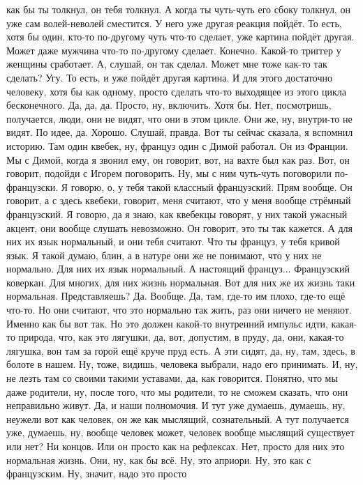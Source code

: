 как бы ты толкнул,
он тебя толкнул. А когда ты чуть-чуть
его сбоку толкнул, он уже сам
волей-неволей сместится.
У него уже другая реакция пойдёт.
То есть, хотя бы один, кто-то
по-другому чуть что-то сделает,
уже картина пойдёт другая.
Может даже мужчина что-то
по-другому сделает. Конечно. Какой-то
триггер у женщины сработает. А, слушай,
он так сделал. Может мне тоже как-то
так сделать? Угу. То есть,
и уже пойдёт другая картина.
И для этого достаточно человеку,
хотя бы как
одному, просто
сделать что-то выходящее
из этого цикла бесконечного.
Да, да, да. Просто, ну, включить.
Хотя бы. Нет, посмотришь, получается, люди,
они не видят, что они в этом цикле.
Они же, ну, внутри-то не видят. По идее, да.
Хорошо. Слушай, правда.
Вот ты сейчас сказала, я вспомнил
историю. Там один
квебек, ну, француз один
с Димой работал. Он из Франции.
Мы с Димой, когда
я звонил ему, он говорит, вот, на вахте
был как раз. Вот, он говорит, подойди
с Игорем поговорить.
Ну, мы с ним чуть-чуть поговорили по-французски.
Я говорю, о, у тебя такой классный французский.
Прям вообще. Он говорит, а с
здесь квебеки, говорит,
меня считают, что у меня вообще стрёмный французский.
Я говорю, да я знаю,
как квебекцы говорят, у них такой ужасный
акцент, они вообще
слушать невозможно.
Он говорит, это ты так кажется. А для них
их язык нормальный, и они тебя считают.
Что ты француз,
у тебя кривой язык.
Я такой думаю, блин, а в натуре
они же не понимают, что
у них не нормально. Для них
их язык нормальный.
А настоящий
француз...
Французский коверкан.
Для многих, для них жизнь
нормальная. Вот для них же их жизнь
таки нормальная. Представляешь?
Да. Вообще.
Да, там, где-то им плохо,
где-то ещё что-то. Но
они считают, что это нормально так жить,
раз они ничего не меняют. Именно как бы вот так.
Но это должен какой-то внутренний
импульс идти, какая-то
природа, что, как это лягушки, да,
вот, допустим,
в пруду, да, они, какая-то лягушка,
вон там за горой ещё круче
пруд есть. А эти сидят,
да, ну, там, здесь, в болоте
в нашем.
Ну, тоже, видишь, человека выбрали, надо его принимать.
И, ну, не лезть там со своими
такими уставами, да,
как говорится. Понятно, что мы даже родители,
ну, после того, что мы родители, то не сможем
сказать, что они неправильно живут.
Да, и наши полномочия. И тут уже думаешь,
думаешь, ну, неужели
вот как человек, он же как
мыслящий, сознательный. А тут
получается уже, думаешь, ну, вообще
человек может, человек вообще мыслящий
существует или нет?
Ни концов. Или он просто
как на рефлексах. Нет, просто для них это нормальная
жизнь. Они, ну, как бы всё.
Ну, это априори. Ну, это как
с французским. Ну, значит, надо это просто
